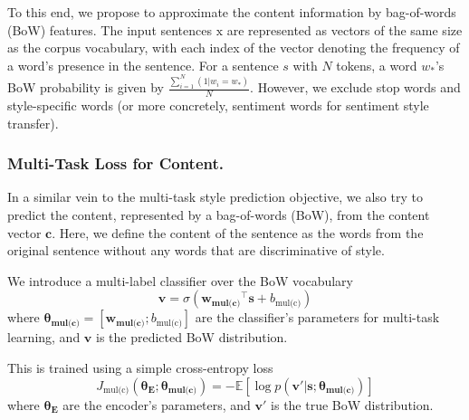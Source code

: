 \documentclass[letterpaper]{article} %
\newcommand{\rmx}{\mathrm x}
\newcommand{\loss}[1]{J_{\text{#1}}}
\newcommand{\nnweight}[1]{\bm{\theta_{\text{#1}}}}
\newcommand{\weight}[1]{\bm{w_{\text{#1}}}}
\newcommand{\bias}[1]{b_{\text{#1}}}
\begin{document}
To this end, we propose to approximate the content information by bag-of-words (BoW) features.
The input sentences $\rmx$ are represented as vectors of the same size as the corpus vocabulary, with each index of the vector denoting the frequency of a word's presence in the sentence.
For a sentence $s$ with $N$ tokens, a word $w_*$'s BoW probability is given by $\frac{\sum_{i=1}^{N}{(1 | w_i = w_*)}}{N}$.
However, we exclude stop words and style-specific words (or more concretely, sentiment words \cite{hu2004mining} for sentiment style transfer).

\subsubsection{Multi-Task Loss for Content.} \label{ssec:multitask-content-objective}

In a similar vein to the multi-task style prediction objective, we also try to predict the content, represented by a bag-of-words (BoW), from the content vector $\bm c$.
Here, we define the content of the sentence as the words from the original sentence without any words that are discriminative of style.

We introduce a multi-label classifier over the BoW vocabulary
\begin{equation} \label{eqn:bow-pred}
	\bm v = \sigma({\weight{mul(c)}}^\top \bm s + \bias{mul(c)})
\end{equation}
where $\nnweight{mul(c)}=[\weight{mul(c)}; \bias{mul(c)}]$ are the classifier's parameters for multi-task learning, and $\bm v$ is the predicted BoW distribution.

This is trained using a simple cross-entropy loss
\begin{equation} \label{eqn:content-multi-task-loss}
	\loss{mul(c)}(\nnweight{E};\nnweight{mul(c)}) =
	- \mathbb{E} [\log p(\bm v' | \bm s; \nnweight{mul(c)})]
\end{equation}
where $\nnweight{E}$ are the encoder's parameters, and $\bm v'$ is the true BoW distribution.

\end{document}
